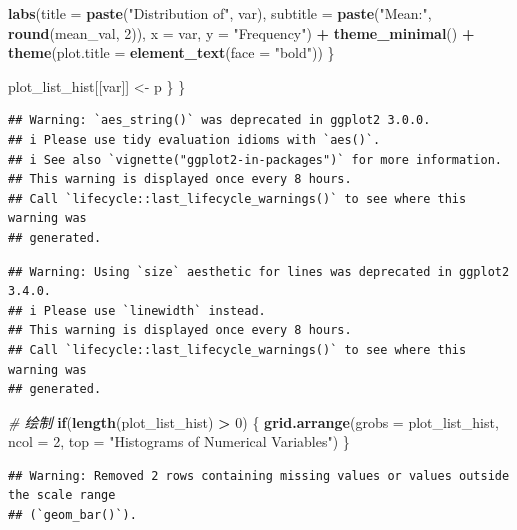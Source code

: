 \documentclass[
]{article}
\newenvironment{Shaded}{\begin{snugshade}}{\end{snugshade}}
\newcommand{\AttributeTok}[1]{\textcolor[rgb]{0.13,0.29,0.53}{#1}}
\newcommand{\CommentTok}[1]{\textcolor[rgb]{0.56,0.35,0.01}{\textit{#1}}}
\newcommand{\ControlFlowTok}[1]{\textcolor[rgb]{0.13,0.29,0.53}{\textbf{#1}}}
\newcommand{\DecValTok}[1]{\textcolor[rgb]{0.00,0.00,0.81}{#1}}
\newcommand{\FunctionTok}[1]{\textcolor[rgb]{0.13,0.29,0.53}{\textbf{#1}}}
\newcommand{\NormalTok}[1]{#1}
\newcommand{\OtherTok}[1]{\textcolor[rgb]{0.56,0.35,0.01}{#1}}
\newcommand{\SpecialCharTok}[1]{\textcolor[rgb]{0.81,0.36,0.00}{\textbf{#1}}}
\newcommand{\StringTok}[1]{\textcolor[rgb]{0.31,0.60,0.02}{#1}}
\begin{document}
\begin{Shaded}
\begin{Highlighting}[]
        \FunctionTok{labs}\NormalTok{(}\AttributeTok{title =} \FunctionTok{paste}\NormalTok{(}\StringTok{"Distribution of"}\NormalTok{, var),}
             \AttributeTok{subtitle =} \FunctionTok{paste}\NormalTok{(}\StringTok{"Mean:"}\NormalTok{, }\FunctionTok{round}\NormalTok{(mean\_val, }\DecValTok{2}\NormalTok{)),}
             \AttributeTok{x =}\NormalTok{ var, }\AttributeTok{y =} \StringTok{"Frequency"}\NormalTok{) }\SpecialCharTok{+}
        \FunctionTok{theme\_minimal}\NormalTok{() }\SpecialCharTok{+}
        \FunctionTok{theme}\NormalTok{(}\AttributeTok{plot.title =} \FunctionTok{element\_text}\NormalTok{(}\AttributeTok{face =} \StringTok{"bold"}\NormalTok{))}
\NormalTok{    \}}
    
\NormalTok{    plot\_list\_hist[[var]] }\OtherTok{\textless{}{-}}\NormalTok{ p}
\NormalTok{  \}}
\NormalTok{\}}
\end{Highlighting}
\end{Shaded}

\begin{verbatim}
## Warning: `aes_string()` was deprecated in ggplot2 3.0.0.
## i Please use tidy evaluation idioms with `aes()`.
## i See also `vignette("ggplot2-in-packages")` for more information.
## This warning is displayed once every 8 hours.
## Call `lifecycle::last_lifecycle_warnings()` to see where this warning was
## generated.
\end{verbatim}

\begin{verbatim}
## Warning: Using `size` aesthetic for lines was deprecated in ggplot2 3.4.0.
## i Please use `linewidth` instead.
## This warning is displayed once every 8 hours.
## Call `lifecycle::last_lifecycle_warnings()` to see where this warning was
## generated.
\end{verbatim}

\begin{Shaded}
\begin{Highlighting}[]
\CommentTok{\# 绘制}
\ControlFlowTok{if}\NormalTok{(}\FunctionTok{length}\NormalTok{(plot\_list\_hist) }\SpecialCharTok{\textgreater{}} \DecValTok{0}\NormalTok{) \{}
  \FunctionTok{grid.arrange}\NormalTok{(}\AttributeTok{grobs =}\NormalTok{ plot\_list\_hist, }\AttributeTok{ncol =} \DecValTok{2}\NormalTok{, }
               \AttributeTok{top =} \StringTok{"Histograms of Numerical Variables"}\NormalTok{)}
\NormalTok{\}}
\end{Highlighting}
\end{Shaded}

\begin{verbatim}
## Warning: Removed 2 rows containing missing values or values outside the scale range
## (`geom_bar()`).
\end{verbatim}
\end{document}

